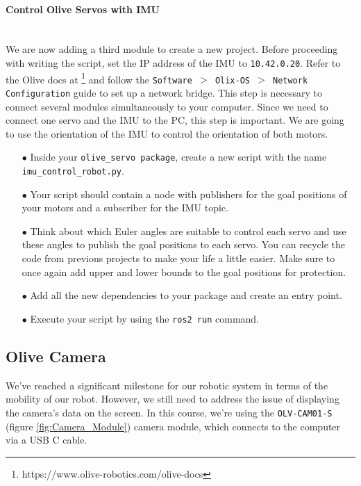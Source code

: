 \documentclass{article}
\begin{document}
\paragraph{Control Olive Servos with IMU}~\\
We are now adding a third module to create a new project. Before proceeding with writing the script, set the IP address of the IMU to \texttt{10.42.0.20}. Refer to the Olive docs at \footnote{https://www.olive-robotics.com/olive-docs} and follow the \texttt{Software $>$ Olix-OS $>$ Network Configuration} guide to set up a network bridge. This step is necessary to connect several modules simultaneously to your computer. Since we need to connect one servo and the IMU to the PC, this step is important. We are going to use the orientation of the IMU to control the orientation of both motors.
\begin{enumerate}
    \item[$\bullet$] Inside your \texttt{olive\_servo package}, create a new script with the name \texttt{imu\_control\_robot.py}.

    \item[$\bullet$] Your script should contain a node with publishers for the goal positions of your motors and a subscriber for the IMU topic.

    \item[$\bullet$] Think about which Euler angles are suitable to control each servo and use these angles to publish the goal positions to each servo. You can recycle the code from previous projects to make your life a little easier. Make sure to once again add upper and lower bounds to the goal positions for protection.

    \item[$\bullet$] Add all the new dependencies to your package and create an entry point.

    \item[$\bullet$] Execute your script by using the \texttt{ros2 run} command.
    
\end{enumerate}

 
\subsection{Olive Camera}
We've reached a significant milestone for our robotic system in terms of the mobility of our robot. However, we still need to address the issue of displaying the camera's data on the screen. In this course, we're using the \texttt{OLV-CAM01-S} (figure \ref{fig:Camera_Module}) camera module, which connects to the computer via a USB C cable.
\end{document}

